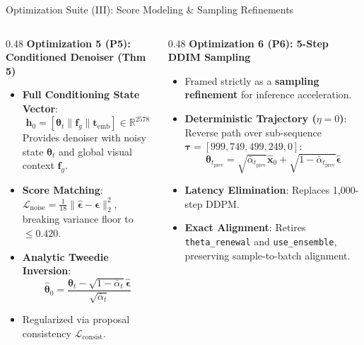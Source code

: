 \documentclass[aspectratio=169,xcolor=dvipsnames]{beamer}
\begin{document}
\begin{frame}{Optimization Suite (III): Score Modeling \& Sampling Refinements}
\footnotesize
\begin{columns}[t,onlytextwidth]
\begin{column}{0.48\textwidth}
    \textbf{Optimization 5 (P5): Conditioned Denoiser (Thm 5)}
    \begin{itemize}
        \setlength{\itemsep}{0.12em}
        \item \textbf{Full Conditioning State Vector}:
        $$\mathbf{h}_0 = [\boldsymbol{\theta}_t \parallel \mathbf{f}_g \parallel \mathbf{t}_{\text{emb}}] \in \mathbb{R}^{2578}$$
        Provides denoiser with noisy state $\boldsymbol{\theta}_t$ and global visual context $\mathbf{f}_g$.
        \item \textbf{Score Matching}: $\mathcal{L}_{\text{noise}} = \frac{1}{18}\|\hat{\boldsymbol{\epsilon}} - \boldsymbol{\epsilon}\|_2^2$, breaking variance floor to $\le 0.420$.
        \item \textbf{Analytic Tweedie Inversion}:
        $$\hat{\boldsymbol{\theta}}_0 = \frac{\boldsymbol{\theta}_t - \sqrt{1 - \bar{\alpha}_t}\hat{\boldsymbol{\epsilon}}}{\sqrt{\bar{\alpha}_t}}$$
        \item Regularized via proposal consistency $\mathcal{L}_{\text{consist}}$.
    \end{itemize}
\end{column}
\begin{column}{0.48\textwidth}
    \textbf{Optimization 6 (P6): 5-Step DDIM Sampling}
    \begin{itemize}
        \setlength{\itemsep}{0.12em}
        \item Framed strictly as a \textbf{sampling refinement} for inference acceleration.
        \item \textbf{Deterministic Trajectory ($\eta=0$)}: Reverse path over sub-sequence $\boldsymbol{\tau} = [999, 749, 499, 249, 0]$:
        $$\boldsymbol{\theta}_{t_{\text{prev}}} = \sqrt{\bar{\alpha}_{t_{\text{prev}}}}\hat{\mathbf{x}}_0 + \sqrt{1 - \bar{\alpha}_{t_{\text{prev}}}}\hat{\boldsymbol{\epsilon}}$$
        \item \textbf{Latency Elimination}: Replaces 1,000-step DDPM.
        \item \textbf{Exact Alignment}: Retires \texttt{theta\_renewal} and \texttt{use\_ensemble}, preserving sample-to-batch alignment.
    \end{itemize}
\end{column}
\end{columns}
\end{frame}
\end{document}
